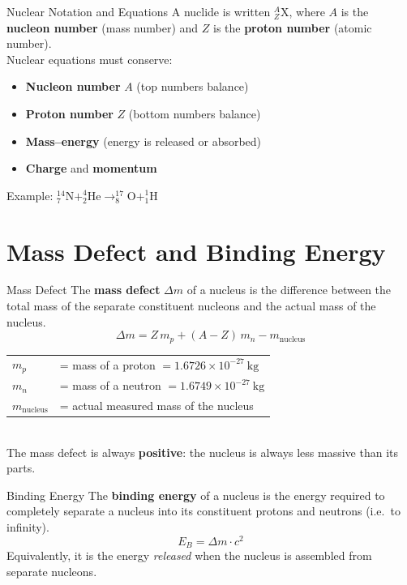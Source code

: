 \begin{keybox}{Nuclear Notation and Equations}
A nuclide is written $^A_Z\text{X}$, where $A$ is the \textbf{nucleon number} (mass number) and $Z$ is the \textbf{proton number} (atomic number).\\[0.5em]
Nuclear equations must conserve:
\begin{itemize}[itemsep=2pt]
  \item \textbf{Nucleon number} $A$ (top numbers balance)
  \item \textbf{Proton number} $Z$ (bottom numbers balance)
  \item \textbf{Mass--energy} (energy is released or absorbed)
  \item \textbf{Charge} and \textbf{momentum}
\end{itemize}
Example: $^{14}_{7}\text{N} + ^{4}_{2}\text{He} \rightarrow ^{17}_{8}\text{O} + ^{1}_{1}\text{H}$
\end{keybox}

\pagebreak


\section{Mass Defect and Binding Energy}

\begin{definitionbox}{Mass Defect}
The \textbf{mass defect} $\Delta m$ of a nucleus is the difference between the total mass of the separate constituent nucleons and the actual mass of the nucleus.
$$\Delta m = Z\,m_p + (A-Z)\,m_n - m_{\text{nucleus}}$$
\begin{tabular}{@{}ll@{}}
$m_p$ & = mass of a proton $= 1.6726\times10^{-27}\ \text{kg}$ \\
$m_n$ & = mass of a neutron $= 1.6749\times10^{-27}\ \text{kg}$ \\
$m_{\text{nucleus}}$ & = actual measured mass of the nucleus \\
\end{tabular}\\[0.4em]
The mass defect is always \textbf{positive}: the nucleus is always less massive than its parts.
\end{definitionbox}

\begin{definitionbox}{Binding Energy}
The \textbf{binding energy} of a nucleus is the energy required to completely separate a nucleus into its constituent protons and neutrons (i.e.\ to infinity).
$$E_B = \Delta m \cdot c^2$$
Equivalently, it is the energy \emph{released} when the nucleus is assembled from separate nucleons.
\end{definitionbox}

